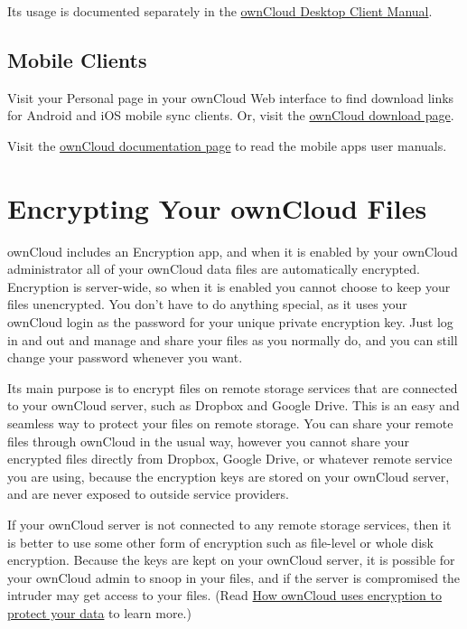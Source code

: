 \documentclass[letterpaper,10pt,english]{sphinxmanual}
\begin{document}
Its usage is documented separately in the \href{https://doc.owncloud.org/}{ownCloud Desktop Client Manual}.


\subsection{Mobile Clients}
\label{files/desktop_mobile_sync:owncloud-desktop-client-manual}\label{files/desktop_mobile_sync:mobile-clients}
Visit your Personal page in your ownCloud Web interface to find download links
for Android and iOS mobile sync clients. Or, visit the \href{https://owncloud.org/install/}{ownCloud download page}.

Visit the \href{https://doc.owncloud.org/}{ownCloud documentation page} to read
the mobile apps user manuals.


\section{Encrypting Your ownCloud Files}
\label{files/encrypting_files:encrypting-your-owncloud-files}\label{files/encrypting_files::doc}
ownCloud includes an Encryption app, and when it is enabled by your ownCloud
administrator all of your ownCloud data files are automatically encrypted.
Encryption is server-wide, so when it is enabled you cannot choose to keep your
files unencrypted. You don't have to do anything special, as it uses your
ownCloud login as the password for your unique private encryption key. Just log
in and out and manage and share your files as you normally do, and you can
still change your password whenever you want.

Its main purpose is to encrypt files on remote storage services that are
connected to your ownCloud server, such as Dropbox and Google Drive. This is an
easy and seamless way to protect your files on remote storage. You can share
your remote files through ownCloud in the usual way, however you cannot share
your encrypted files directly from Dropbox, Google Drive, or whatever remote
service you are using, because the encryption keys are stored on your ownCloud
server, and are never exposed to outside service providers.

If your ownCloud server is not connected to any remote storage services, then
it is better to use some other form of encryption such as file-level or whole
disk encryption. Because the keys are kept on your ownCloud server, it is
possible for your ownCloud admin to snoop in your files, and if the server is
compromised the intruder may get access to your files. (Read
\href{https://owncloud.org/blog/how-owncloud-uses-encryption-to-protect-your-data/}{How ownCloud uses encryption to protect your data}
to learn more.)
\end{document}
